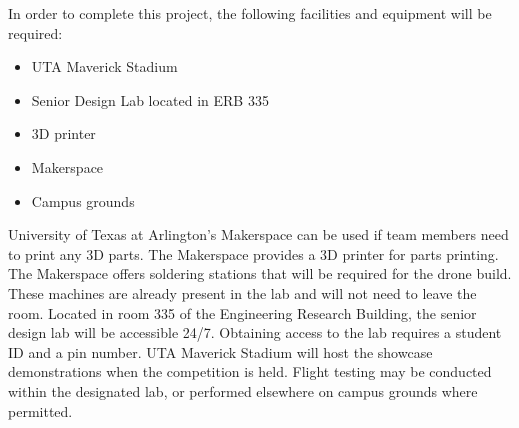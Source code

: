 

In order to complete this project, the following facilities and equipment will be required:
\begin{itemize}
  \item UTA Maverick Stadium
  \item Senior Design Lab located in ERB 335
  \item 3D printer
  \item Makerspace
  \item Campus grounds
\end{itemize}
University of Texas at Arlington's Makerspace can be used if team members need to print any 3D parts. The Makerspace provides a 3D printer for parts printing. The Makerspace offers soldering stations that will be required for the drone build. These machines are already present in the lab and will not need to leave the room. Located in room 335 of the Engineering Research Building, the senior design lab will be accessible 24/7. Obtaining access to the lab requires a student ID and a pin number. UTA Maverick Stadium will host the showcase demonstrations when the competition is held. Flight testing may be conducted within the designated lab, or performed elsewhere on campus grounds where permitted.
